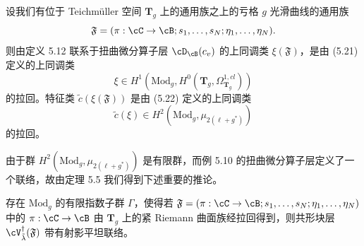 \begin{theorem}[5.13]
 设我们有位于 Teichmüller 空间 $\mathbf T_g$ 上的通用族之上的亏格 $g$ 光滑曲线的通用族
 \[
  \mathfrak F=(\pi:\cC\to\cB;s_1,\dots,s_N;\eta_1,\dots,\eta_N).
 \]
 则由定义 5.12 联系于扭曲微分算子层 $\cD_\cB(c_v)$ 的上同调类 $\xi(\mathfrak F)$，是由 (5.21) 定义的上同调类
 \[
  \xi\in H^1(\mathrm{Mod}_g,H^0(\mathbf T_g,\Omega^{1,cl}_{\mathbf T_g}))
 \]
 的拉回。特征类 $\tilde c(\xi(\mathfrak F))$ 是由 (5.22) 定义的上同调类
 \[
  \tilde c(\xi)\in H^2(\mathrm{Mod}_g,\mu_{2(\ell+g^*)})
 \]
 的拉回。
\end{theorem}

由于群 $H^2(\mathrm{Mod}_g,\mu_{2(\ell+g^*)})$ 是有限群，而例 5.10 的扭曲微分算子层定义了一个联络，故由定理 5.5 我们得到下述重要的推论。

\begin{corollary}[5.14]
 存在 $\mathrm{Mod}_g$ 的有限指数子群 $\Gamma$，使得若 $\mathfrak F=(\pi:\cC\to\cB;s_1,\dots,s_N;\eta_1,\dots,\eta_N)$ 中的 $\pi:\cC\to\cB$ 由 $\mathbf T_g$ 上的紧 Riemann 曲面族经拉回得到，则共形块层 $\cV^\dagger_{\tilde\lambda}(\mathfrak F)$ 带有射影平坦联络。
\end{corollary}
